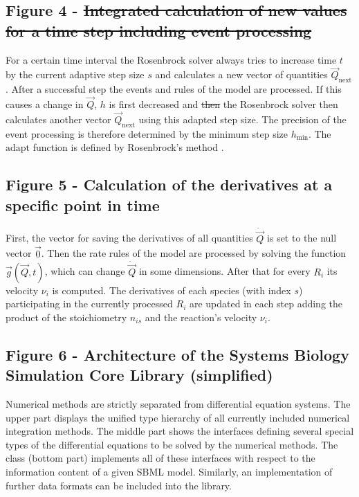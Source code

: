 \documentclass[10pt]{bmc_article}
\newenvironment{bmcformat}{\begin{raggedright}\baselineskip20pt\sloppy\setboolean{publ}{false}}{\end{raggedright}\baselineskip20pt\sloppy}
\begin{document}
\begin{bmcformat}
\subsection*{Figure 4 - \sout{Integrated calculation of new values for a time step including event processing}}
For a certain time interval\COR{,} the Rosenbrock solver  always tries to increase time $t$ by the current adaptive
step size $s$ and calculates a new vector of quantities $\vec{Q}_{\mathrm{next}}$.
After a successful step\COR{,} the events and rules of the model are processed.
If this causes a change in $\vec{Q}$, $h$ is first decreased and \sout{then} the
Rosenbrock solver then calculates another vector $\vec{Q}_\mathrm{next}$ using this adapted step size.
The precision of the event processing is therefore determined by the minimum step size $h_{\min}$.
The $\mathrm{adapt}$ function is defined by Rosenbrock's method \cite{Press1993}.

\subsection*{Figure 5 - Calculation of the derivatives at a specific point in time}
First, the vector for saving the derivatives of all quantities $\dot{\vec{Q}}$ is set to the null vector $\vec{0}$.
Then the rate rules of the model are processed by solving the function $\vec{g}(\vec{Q}, t)$, which can change $\dot{\vec{Q}}$ in some dimensions.
After that for every  $R_i$ its velocity $\nu_i$ is computed.
The derivatives of each species (with index $s$) participating in the currently processed  $R_i$ are updated
in each step adding the product of the stoichiometry $n_{is}$ and the reaction's velocity $\nu_i$.

\subsection*{Figure 6 - Architecture of the Systems Biology Simulation Core Library (simplified)}
Numerical methods are strictly separated from differential equation systems. The
upper part displays the unified type hierarchy of all currently included numerical integration
methods. The middle part shows the interfaces defining several
special types of the differential equations to be solved by the numerical
methods.
The class \SBMLinterpreter (bottom part) implements all of these interfaces
with respect to the information content of a given \acs{SBML} model. Similarly, an
implementation of further data formats can be included into the
library.


\end{bmcformat}
\end{document}

